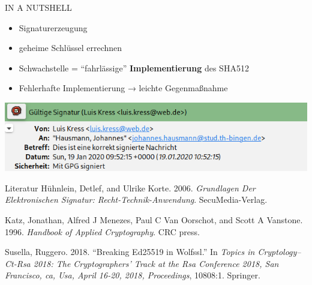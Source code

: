 \documentclass[
  11 pt,
  ignorenonframetext,
  aspectratio=43,
]{beamer}
\providecommand{\tightlist}{%
  \setlength{\itemsep}{0pt}\setlength{\parskip}{0pt}}
\newlength{\cslhangindent}
\newenvironment{cslreferences}%
  {\setlength{\parindent}{0pt}%
  \everypar{\setlength{\hangindent}{\cslhangindent}}\ignorespaces}%
  {\par}
\begin{document}
\begin{frame}{IN A NUTSHELL}
\protect\hypertarget{in-a-nutshell}{}
\begin{itemize}
\tightlist
\item
  Signaturerzeugung
\end{itemize}

\pause

\begin{itemize}
\tightlist
\item
  geheime Schlüssel errechnen
\end{itemize}

\pause

\begin{itemize}
\tightlist
\item
  Schwachstelle = ``fahrlässige'' \textbf{Implementierung} des SHA512
\end{itemize}

\pause

\begin{itemize}
\tightlist
\item
  Fehlerhafte Implementierung → leichte Gegenmaßnahme
\end{itemize}
\end{frame}

\begin{frame}{}
\protect\hypertarget{section-25}{}
\includegraphics{Abbildungen/klsig.png}
\end{frame}

\begin{frame}{Literatur}
\protect\hypertarget{literatur}{}
\hypertarget{refs}{}
\begin{cslreferences}
\leavevmode\hypertarget{ref-huhnlein2006grundlagen}{}%
Hühnlein, Detlef, and Ulrike Korte. 2006. \emph{Grundlagen Der
Elektronischen Signatur: Recht-Technik-Anwendung}. SecuMedia-Verlag.

\leavevmode\hypertarget{ref-katz1996handbook}{}%
Katz, Jonathan, Alfred J Menezes, Paul C Van Oorschot, and Scott A
Vanstone. 1996. \emph{Handbook of Applied Cryptography}. CRC press.

\leavevmode\hypertarget{ref-susella2018breaking}{}%
Susella, Ruggero. 2018. ``Breaking Ed25519 in Wolfssl.'' In \emph{Topics
in Cryptology--Ct-Rsa 2018: The Cryptographers' Track at the Rsa
Conference 2018, San Francisco, ca, Usa, April 16-20, 2018,
Proceedings}, 10808:1. Springer.
\end{cslreferences}
\end{frame}
\end{document}
